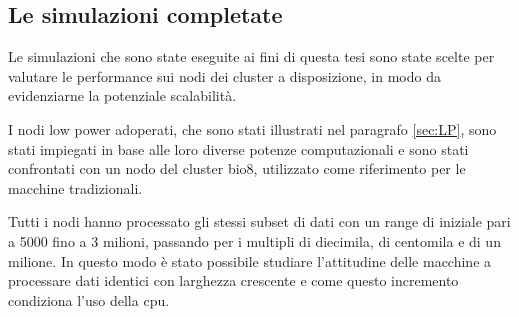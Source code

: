 %
%
 
\subsection{Le simulazioni completate} 
\label{subsec:simc}
Le simulazioni che sono state eseguite ai fini di questa tesi sono state scelte per valutare le performance sui nodi dei cluster a disposizione, in modo da evidenziarne la potenziale scalabilità.

I nodi low power adoperati, che sono stati illustrati nel paragrafo \ref{sec:LP}, sono stati impiegati in base alle loro diverse potenze computazionali e sono stati confrontati con un nodo del cluster bio8, utilizzato come riferimento per le macchine tradizionali.  

Tutti i nodi hanno processato gli stessi subset di dati con un range di iniziale pari a 5000 fino a 3 milioni, passando per i multipli di diecimila, di centomila e di un milione.
In questo modo è stato possibile studiare l'attitudine delle macchine a processare dati identici con larghezza crescente e come questo incremento condiziona l'uso della cpu. 

